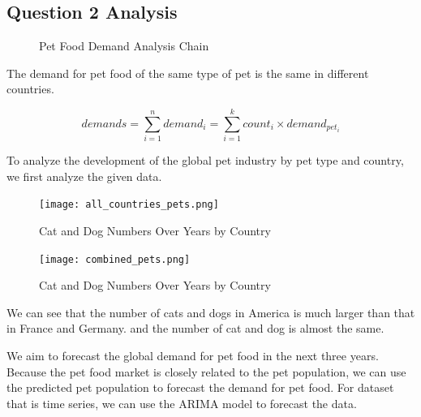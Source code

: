 \documentclass[withoutpreface,bwprint]{cumcmthesis} %
\begin{document}
\subsection{Question 2 Analysis}
\usetikzlibrary{positioning}
\begin{figure}[htbp]
    \centering
    \caption{Pet Food Demand Analysis Chain}
\end{figure}
\begin{assumption}
    The demand for pet food of the same type of pet is the same in different countries.
\end{assumption}
 \[demands=\sum_{i=1}^{n} demand_i=\sum_{i=1}^{k} count_i \times demand_{pet_i}\]
\par To analyze the development of the global pet industry by pet type and country,
we first analyze the given data.
\begin{figure}[htbp]
	\centering
	\texttt{[image: all\_countries\_pets.png]}
	\caption{Cat and Dog Numbers Over Years by Country}
\end{figure}
\begin{figure}[htbp]
	\centering
	\texttt{[image: combined\_pets.png]}
	\caption{Cat and Dog Numbers Over Years by Country}
\end{figure}
\par We can see that the number of cats and dogs in America is much larger than that in France and Germany.
and the number of cat and dog is almost the same.
\par We aim to forecast the global demand for pet food in the next three years.
Because the pet food market is closely related to the pet population, we can use the predicted pet population to forecast the demand for pet food.
For dataset that is time series, we can use the ARIMA model to forecast the data.
\end{document}
